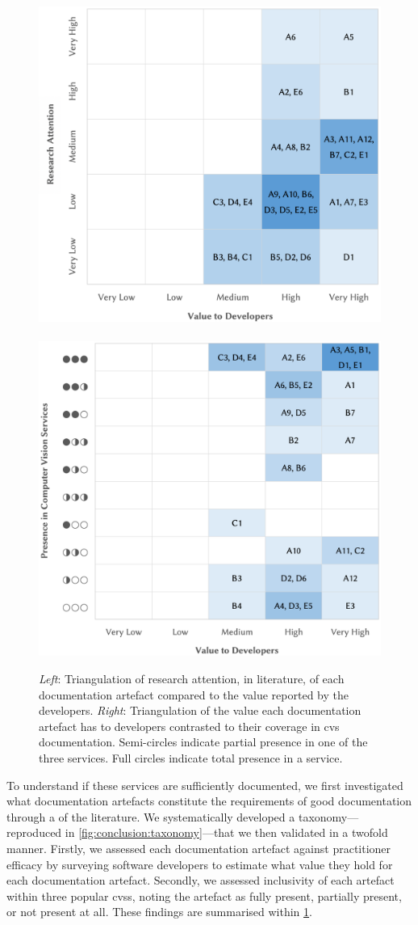 \begin{figure}[t]
	\centering
	\includegraphics[width=.5\linewidth]{mainmatter/publications/figures/tse2020/ips-vs-ils}~
	\includegraphics[width=.5\linewidth]{mainmatter/publications/figures/tse2020/ips-vs-cvs2}
	\caption[Comparing IPS values to ILS and CVS assessments]{\textit{Left}: Triangulation of research attention, in literature, of each documentation artefact compared to the value reported by the developers. \textit{Right}: Triangulation of the value each documentation artefact has to developers contrasted to their coverage in \gls{cvs}  documentation. Semi-circles indicate partial presence in one of the three services. Full circles indicate total presence in a service.}
	    \label{fig:conclusion:ils-ips-cvs}
\end{figure}

To understand if these services are sufficiently documented, we first investigated what documentation artefacts constitute the requirements of good  documentation through a  of the literature. We systematically developed a taxonomy---reproduced in \cref{fig:conclusion:taxonomy}---that we then validated in a twofold manner. Firstly, we assessed each documentation artefact against practitioner efficacy by surveying \SurveyParticipantsTotal{} software developers to estimate what value they hold for each documentation artefact. Secondly, we assessed inclusivity of each artefact within three popular \glspl{cvs}, noting the artefact as fully present, partially present, or not present at all. These findings are summarised within \cref{fig:conclusion:ils-ips-cvs}.

